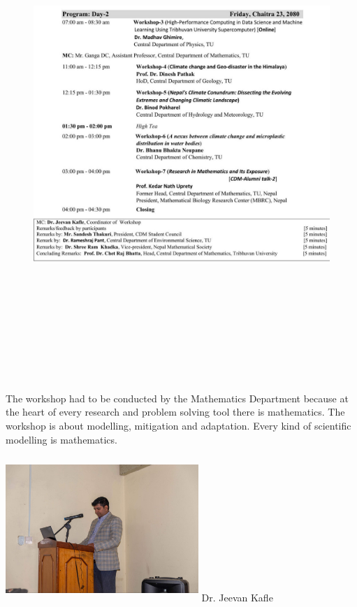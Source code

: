 \documentclass[a4paper,12pt]{report}
\begin{document}
\begin{figure}[h!]
  \centering
  \includegraphics[width=17.5cm, height=18.5cm]{p2.jpg}
\end{figure}

\begin{minipage}{0.45\textwidth}
  The workshop had to be conducted by the Mathematics Department because at the heart of every research and problem solving tool there is mathematics. The workshop is about modelling, mitigation and adaptation. Every kind of scientific modelling is mathematics.
\end{minipage} \hspace{5mm}
\begin{minipage}{0.41\textwidth}
  \includegraphics[width=7.3cm, height=5.5cm]{jeevan.jpeg}
 \hspace*{5mm} Dr. Jeevan Kafle
 \end{minipage}
\end{document}

